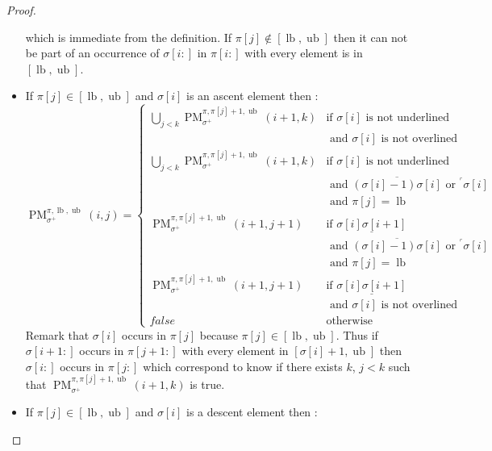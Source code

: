 \documentclass[a4paper]{llncs}
\newcommand{\ptext}{\pi}
\newcommand{\pmotif}{\sigma}
\newcommand{\pbmotif}{\pmotif^+}
\DeclareMathOperator{\PMa}{PM}
\newcommand{\PM}[6]{\PMa_{{#1}}^{{#2},{#3},{#4}}({#5},{#6})}
\DeclareMathOperator{\lb}{lb}
\DeclareMathOperator{\ub}{ub}
\begin{document}
\begin{proof}
\begin{itemize}
	which is immediate from the definition. If $\ptext[j] \notin [\lb,\ub]$ then it can not be part of an occurrence of  $\pmotif[i:]$ in $\ptext[i:]$ with every element is in $[\lb,\ub]$.
	
	\item If $\ptext[j] \in [\lb,\ub]$ and $\pmotif[i]$ is an ascent element then :
	$$
	\PM{\pbmotif}{\ptext}{\lb}{\ub}{i}{j}=
	\begin{cases}
		\bigcup_{j<k} \PM{\pbmotif}{\ptext}{\ptext[j]+1}{\ub}{i+1}{k}
			& \text{if $\pmotif[i]$ is not underlined } \\
			& \text{ and $\pmotif[i]$ is not overlined} \\
		\bigcup_{j<k} \PM{\pbmotif}{\ptext}{\ptext[j]+1}{\ub}{i+1}{k}
			& \text{if $\pmotif[i]$ is not underlined } \\
			& \text{ and $\overline{(\pmotif[i]-1)\pmotif[i]}$ or $^\ulcorner{\pmotif[i]}$}\\
			& \text{ and $\ptext[j]=\lb$} \\
		\PM{\pbmotif}{\ptext}{\ptext[j]+1}{\ub}{i+1}{j+1}
			& \text{if $\underline{\pmotif[i]\pmotif[i+1]}$ } \\
			& \text{ and $\overline{(\pmotif[i]-1)\pmotif[i]}$ or $^\ulcorner{\pmotif[i]}$}\\
			& \text{ and $\ptext[j]=\lb$} \\
		\PM{\pbmotif}{\ptext}{\ptext[j]+1}{\ub}{i+1}{j+1}
			& \text{if $\underline{\pmotif[i]\pmotif[i+1]}$ } \\
			& \text{ and $\pmotif[i]$ is not overlined} \\
		false & \text{otherwise}

	\end{cases}
	$$	
	Remark that $\pmotif[i]$ occurs in $\ptext[j]$ because $\ptext[j] \in [\lb,\ub]$.
	Thus if $\pmotif[i+1:]$ occurs in $\ptext[j+1:]$ with every element in $[\pmotif[i]+1,\ub]$ then 
 	$\pmotif[i:]$ occurs in $\ptext[j:]$  	
 	which correspond to know if there exists $k$, $j<k$ such that
	$\PM{\pbmotif}{\ptext}{\ptext[j]+1}{\ub}{i+1}{k}$ is true.

	
	\item If $\ptext[j] \in [\lb,\ub]$ and $\pmotif[i]$ is a descent element then :


\end{itemize}
\end{proof}
\end{document}

